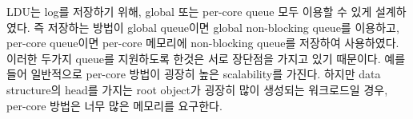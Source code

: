 









\fi


\ifkor
LDU는 log를 저장하기 위해, global 또는 per-core queue 모두 이용할 수 있게 설계하였다.
즉 저장하는 방법이 global queue이면 global non-blocking queue를 이용하고, per-core queue이면
per-core 메모리에 non-blocking queue를 저장하여 사용하였다. 
이러한 두가지 queue를 지원하도록 한것은 서로 장단점을 가지고 있기 때문이다.
예를 들어 일반적으로 per-core 방법이 굉장히 높은 scalability를 가진다. 
하지만 data structure의 head를 가지는 root object가 굉장히 많이 생성되는 워크로드일 경우,
per-core 방법은 너무 많은 메모리를 요구한다.
\else














